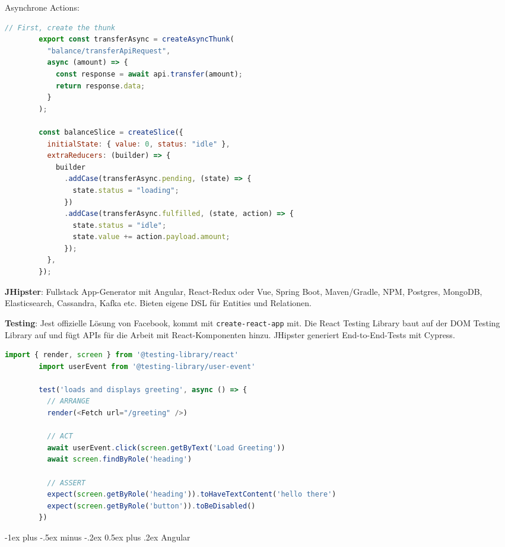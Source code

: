\documentclass[10pt,landscape]{article}
\makeatletter
\renewcommand{\section}{\@startsection{section}{1}{0mm}%
{-1ex plus -.5ex minus -.2ex}%
{0.5ex plus .2ex}%
{\normalfont\large\bfseries}}
\makeatother
\begin{document}
\begin{multicols}{2}
        Asynchrone Actions:

        \begin{lstlisting}[language=JavaScript]
        // First, create the thunk
        export const transferAsync = createAsyncThunk(
          "balance/transferApiRequest",
          async (amount) => {
            const response = await api.transfer(amount);
            return response.data;
          }
        );

        const balanceSlice = createSlice({
          initialState: { value: 0, status: "idle" },
          extraReducers: (builder) => {
            builder
              .addCase(transferAsync.pending, (state) => {
                state.status = "loading";
              })
              .addCase(transferAsync.fulfilled, (state, action) => {
                state.status = "idle";
                state.value += action.payload.amount;
              });
          },
        });
        \end{lstlisting}

        \textbf{JHipster}: Fullstack App-Generator mit Angular, React-Redux oder Vue, Spring Boot, Maven/Gradle, NPM, Postgres, MongoDB, Elasticsearch, Cassandra, Kafka etc.
        Bieten eigene DSL für Entities und Relationen.

        \textbf{Testing}: Jest offizielle Lösung von Facebook, kommt mit \lstinline{create-react-app} mit.
        Die React Testing Library baut auf der DOM Testing Library auf und fügt APIs für die Arbeit mit React-Komponenten hinzu.
        JHipster generiert End-to-End-Tests mit Cypress.

        \begin{lstlisting}[language=JavaScript]
        import { render, screen } from '@testing-library/react'
        import userEvent from '@testing-library/user-event'

        test('loads and displays greeting', async () => {
          // ARRANGE
          render(<Fetch url="/greeting" />)

          // ACT
          await userEvent.click(screen.getByText('Load Greeting'))
          await screen.findByRole('heading')

          // ASSERT
          expect(screen.getByRole('heading')).toHaveTextContent('hello there')
          expect(screen.getByRole('button')).toBeDisabled()
        })
        \end{lstlisting}


        \section{Angular}


\end{multicols}
\end{document}
